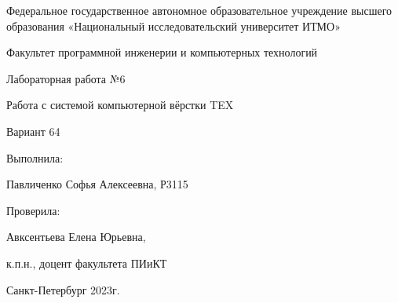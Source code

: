 \thispagestyle{empty}

\begin{center}
    Федеральное государственное автономное образовательное учреждение высшего \\образования «Национальный исследовательский университет ИТМО»
    \vspace{12pt}
    
    Факультет программной инженерии и компьютерных технологий
\end{center}

\vspace{26em}

\begin{vcenterpage}
    \begin{center}
        Лабораторная работа №6
        
        Работа с системой компьютерной вёрстки TEX
        
        Вариант 64    
    \end{center}    
\end{vcenterpage}

\vspace{16em}

\begin{flushright}
Выполнила:

Павличенко Софья Алексеевна, Р3115
\vspace{12pt}

Проверила: 

Авксентьева Елена Юрьевна,

к.п.н., доцент факультета ПИиКТ
\end{flushright}

\vspace{10em}

\begin{center}
    Санкт-Петербург 2023г.
\end{center}
